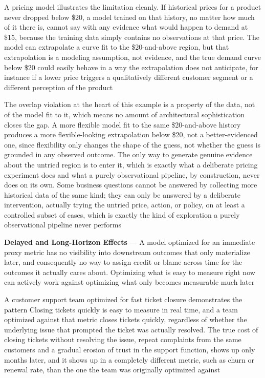 A pricing model illustrates the limitation cleanly. If historical prices for a product
never dropped below \$20, a model trained on that history, no matter how much of
it there is, cannot say with any evidence what would happen to demand at \$15, because
the training data simply contains no observations at that price. The model can
extrapolate a curve fit to the \$20-and-above region, but that extrapolation is
a modeling assumption, not evidence, and the true demand curve below \$20 could easily
behave in a way the extrapolation does not anticipate, for instance if a lower
price triggers a qualitatively different customer segment or a different
perception of the product

The overlap violation at the heart of this example is a property of the data,
not of the model fit to it, which means no amount of architectural sophistication
closes the gap. A more flexible model fit to the same \$20-and-above history produces
a more flexible-looking extrapolation below \$20, not a better-evidenced one,
since flexibility only changes the shape of the guess, not whether the guess is grounded
in any observed outcome. The only way to generate genuine evidence about the
untried region is to enter it, which is exactly what a deliberate pricing experiment
does and what a purely observational pipeline, by construction, never does on its
own. Some business questions cannot be answered by collecting more historical
data of the same kind; they can only be answered by a deliberate intervention,
actually trying the untried price, action, or policy, on at least a controlled subset
of cases, which is exactly the kind of exploration a purely observational
pipeline never performs

\textbf{Delayed and Long-Horizon Effects} --- A model optimized for an immediate
proxy metric has no visibility into downstream outcomes that only materialize
later, and consequently no way to assign credit or blame across time for the outcomes
it actually cares about. Optimizing what is easy to measure right now can
actively work against optimizing what only becomes measurable much later

A customer support team optimized for fast ticket closure demonstrates the pattern
Closing tickets quickly is easy to measure in real time, and a team optimized
against that metric closes tickets quickly, regardless of whether the underlying
issue that prompted the ticket was actually resolved. The true cost of closing
tickets without resolving the issue, repeat complaints from the same customers and
a gradual erosion of trust in the support function, shows up only months later, and
it shows up in a completely different metric, such as churn or renewal rate, than
the one the team was originally optimized against

